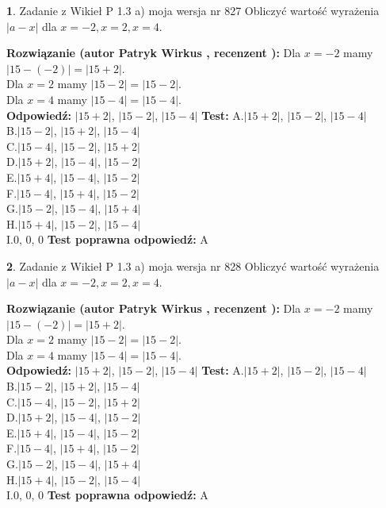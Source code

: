 \documentclass[12pt, a4paper]{article}
\theoremstyle{definition} %
\newtheorem{zad}{}
\newcommand{\zadStart}[1]{\begin{zad}#1\newline}
\newcommand{\zadStop}{\end{zad}}
\newcommand{\rozwStart}[2]{\noindent \textbf{Rozwiązanie (autor #1 , recenzent #2): }\newline}
\newcommand{\rozwStop}{\newline}
\newcommand{\odpStart}{\noindent \textbf{Odpowiedź:}\newline}
\newcommand{\odpStop}{\newline}
\newcommand{\testStart}{\noindent \textbf{Test:}\newline}
\newcommand{\testStop}{\newline}
\newcommand{\kluczStart}{\noindent \textbf{Test poprawna odpowiedź:}\newline}
\newcommand{\kluczStop}{\newline}
\begin{document}
\zadStart{Zadanie z Wikieł P 1.3 a) moja wersja nr 827}
Obliczyć wartość wyrażenia $|a - x|$ dla $x=-2,x=2,x=4$.
\zadStop
\rozwStart{Patryk Wirkus}{}
Dla $x = -2$ mamy $|15 - (-2)| = |15 + 2|$.\\
Dla $x = 2$ mamy $|15 - 2| = |15 - 2|$.\\
Dla $x = 4$ mamy $|15 - 4| = |15 - 4|$.\\
\rozwStop
\odpStart
$|15 + 2|$, $|15 - 2|$, $|15 - 4|$
\odpStop
\testStart
A.$|15 + 2|$, $|15 - 2|$, $|15 - 4|$\\
B.$|15 - 2|$, $|15 + 2|$, $|15 - 4|$\\
C.$|15 - 4|$, $|15 - 2|$, $|15 + 2|$\\
D.$|15 + 2|$, $|15 - 4|$, $|15 - 2|$\\
E.$|15 + 4|$, $|15 - 4|$, $|15 - 2|$\\
F.$|15 - 4|$, $|15 + 4|$, $|15 - 2|$\\
G.$|15 - 2|$, $|15 - 4|$, $|15 + 4|$\\
H.$|15 + 4|$, $|15 - 2|$, $|15 - 4|$\\
I.$0$, $0$, $0$
\testStop
\kluczStart
A
\kluczStop



\zadStart{Zadanie z Wikieł P 1.3 a) moja wersja nr 828}
Obliczyć wartość wyrażenia $|a - x|$ dla $x=-2,x=2,x=4$.
\zadStop
\rozwStart{Patryk Wirkus}{}
Dla $x = -2$ mamy $|15 - (-2)| = |15 + 2|$.\\
Dla $x = 2$ mamy $|15 - 2| = |15 - 2|$.\\
Dla $x = 4$ mamy $|15 - 4| = |15 - 4|$.\\
\rozwStop
\odpStart
$|15 + 2|$, $|15 - 2|$, $|15 - 4|$
\odpStop
\testStart
A.$|15 + 2|$, $|15 - 2|$, $|15 - 4|$\\
B.$|15 - 2|$, $|15 + 2|$, $|15 - 4|$\\
C.$|15 - 4|$, $|15 - 2|$, $|15 + 2|$\\
D.$|15 + 2|$, $|15 - 4|$, $|15 - 2|$\\
E.$|15 + 4|$, $|15 - 4|$, $|15 - 2|$\\
F.$|15 - 4|$, $|15 + 4|$, $|15 - 2|$\\
G.$|15 - 2|$, $|15 - 4|$, $|15 + 4|$\\
H.$|15 + 4|$, $|15 - 2|$, $|15 - 4|$\\
I.$0$, $0$, $0$
\testStop
\kluczStart
A
\kluczStop
\end{document}
